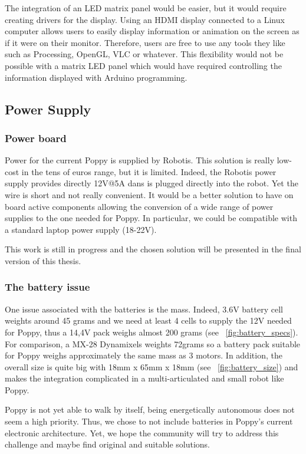 The integration of an LED matrix panel would be easier, but it would require creating drivers for the display.
Using an HDMI display connected to a Linux computer allows users to easily display information or animation on the screen as if it were on their monitor. Therefore, users are free to use any tools they like such as Processing, OpenGL, VLC or whatever. This flexibility would not be possible with a matrix LED panel which would have required controlling the information displayed with Arduino programming.

\subsection{Power Supply} %
\label{ssub:alimentation}

\subsubsection{Power board} %
Power for the current Poppy is supplied by Robotis. This solution is really low-cost in the tens of euros range, but it is limited. Indeed, the Robotis power supply provides directly 12V@5A dans is plugged directly into the robot. Yet the wire is short and not really convenient. It would be a better solution to have on board active components allowing the conversion of a wide range of power supplies to the one needed for Poppy. In particular, we could be compatible with a standard laptop power supply (18-22V).

This work is still in progress and the chosen solution will be presented in the final version of this thesis.


\subsubsection{The battery issue} %

One issue associated with the batteries is the mass. Indeed, 3.6V battery cell weights around 45 grams and we need at least 4 cells to supply the 12V needed for Poppy, thus a 14,4V pack weighs almost 200 grams (see \figurename~\ref{fig:battery_specs}). For comparison, a MX-28 Dynamixels weights 72grams so a battery pack suitable for Poppy weighs approximately the same mass as 3 motors.
In addition, the overall size is quite big with 18mm x 65mm x 18mm (see \figurename~\ref{fig:battery_size}) and makes the integration complicated in a multi-articulated and small robot like Poppy.

Poppy is not yet able to walk by itself, being energetically autonomous does not seem a high priority. Thus, we chose to not include batteries in Poppy’s current electronic architecture. Yet, we hope the community will try to address this challenge and maybe find original and suitable solutions.

